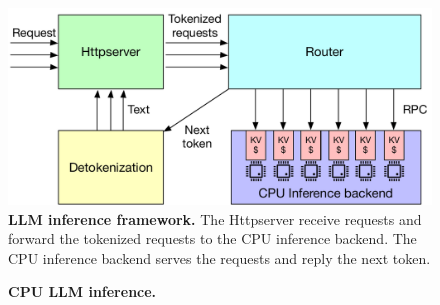 \begin{figure}[t]
\centering
 \includegraphics[width=\columnwidth]{fig/cxl/llm.pdf}
  \caption[LLM inference framework]{\textbf{LLM inference framework.} The Httpserver receive requests and forward the tokenized requests to the CPU inference backend. The CPU inference backend serves the requests and reply the next token.}
\label{fig:llm-framework}
\vspace{-2.5em}
\end{figure}

\begin{figure}[h!]
\centering
\vspace{-0.5em}
\caption[CPU LLM inference]{\textbf{CPU LLM inference.} }
\vspace{-0.5em}
\end{figure}

